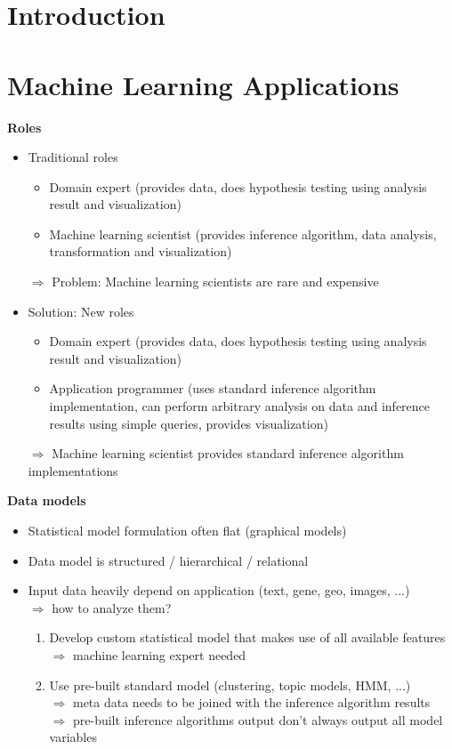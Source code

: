 \documentclass[a4paper, 11pt, titlepage]{scrartcl}
\begin{document}


\begin{abstract}

\end{abstract}

\section{Introduction}

\section{Machine Learning Applications}

\textbf{Roles}
\begin{itemize}
\item Traditional roles
	\begin{itemize}
	\item Domain expert (provides data, does hypothesis testing using analysis result and visualization)
	\item Machine learning scientist (provides inference algorithm, data analysis, transformation and visualization)
	\end{itemize}
	$\Rightarrow$ Problem: Machine learning scientists are rare and expensive
\item Solution: New roles
	\begin{itemize}
	\item Domain expert (provides data, does hypothesis testing using analysis result and visualization)
	\item Application programmer (uses standard inference algorithm implementation, can perform arbitrary analysis on data and inference results using simple queries, provides visualization)
	\end{itemize}
	$\Rightarrow$ Machine learning scientist provides standard inference algorithm implementations
\end{itemize}

\textbf{Data models}
\begin{itemize}
\item Statistical model formulation often flat (graphical models)
\item Data model is structured / hierarchical / relational
\item Input data heavily depend on application (text, gene, geo, images, ...)\\
$\Rightarrow$ how to analyze them?
	\begin{enumerate}
	\item Develop custom statistical model that makes use of all available features\\
	$\Rightarrow$ machine learning expert needed
	\item Use pre-built standard model (clustering, topic models, HMM, ...)\\
	$\Rightarrow$ meta data needs to be joined with the inference algorithm results\\
	$\Rightarrow$ pre-built inference algorithms output don't always output all model variables
	\end{enumerate}
\end{itemize}
\end{document}
